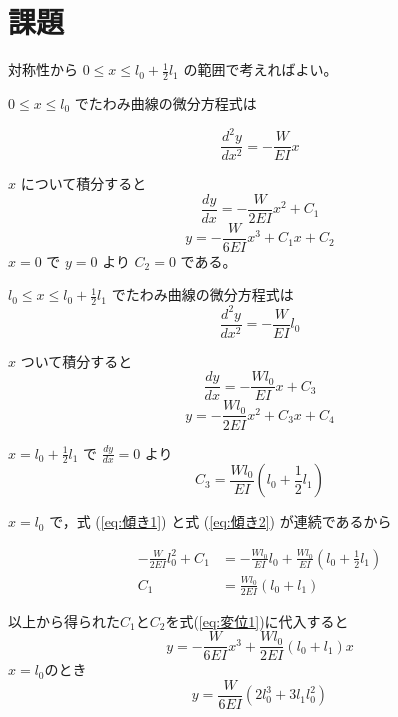 \section{課題}

対称性から $0 \leq x \leq l_0 + \frac{1}{2}l_1$ の範囲で考えればよい。

$0 \leq x \leq l_0$ でたわみ曲線の微分方程式は

\begin{equation}
    \frac{d^2y}{dx^2} = -\frac{W}{EI}x
    \label{eq:たわみ式1}
\end{equation}

\(x\) について積分すると
\begin{equation}
    \frac{dy}{dx} = -\frac{W}{2EI}x^2 + C_1
    \label{eq:傾き1}
\end{equation}
\begin{equation}
    y = -\frac{W}{6EI}x^3 + C_1x + C_2
    \label{eq:変位1}
\end{equation}
$x = 0$ で $y = 0$ より $C_2 = 0$ である。

$l_0 \leq x \leq l_0 + \frac{1}{2}l_1$ でたわみ曲線の微分方程式は
\begin{equation}
    \frac{d^2y}{dx^2} = -\frac{W}{EI}l_0
    \label{eq:たわみ式2}
\end{equation}

\(x\) ついて積分すると
\begin{equation}
    \frac{dy}{dx} = -\frac{Wl_0}{EI}x + C_3
    \label{eq:傾き2}
\end{equation}
\begin{equation}
    y = -\frac{Wl_0}{2EI}x^2 + C_3x + C_4
    \label{eq:変位2}
\end{equation}

$x = l_0 + \frac{1}{2}l_1$ で $\frac{dy}{dx} = 0$ より
\begin{equation}
    C_3 = \frac{Wl_0}{EI}(l_0 + \frac{1}{2}l_1)
    \label{eq:C3}
\end{equation}

$x = l_0$ で，式 (\ref{eq:傾き1}) と式 (\ref{eq:傾き2}) が連続であるから

\begin{align}
    -\frac{W}{2EI}l_0^2 + C_1 &= -\frac{Wl_0}{EI}l_0 + \frac{Wl_0}{EI}(l_0 + \frac{1}{2}l_1)\\
    C_1 &= \frac{Wl_0}{2EI}(l_0 + l_1)
    \label{eq:連続条件1}
\end{align}

以上から得られた$C_1$と$C_2$を式(\ref{eq:変位1})に代入すると
\begin{equation}
    y = -\frac{W}{6EI}x^3 + \frac{Wl_0}{2EI}(l_0 + l_1)x
    \label{eq:変位1_2}
\end{equation}
$x = l_0$のとき
\begin{equation}
    y = \frac{W}{6EI}(2l_0^3 + 3l_1l_0^2)
    \label{eq:変位1_3}
\end{equation}